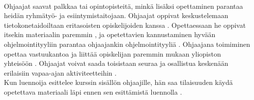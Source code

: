 \documentclass[finnish]{tktltiki2}
\theoremstyle{definition}
\theoremstyle{remark}
\begin{document}
\\
Ohjaajat saavat palkkaa tai opintopisteitä, minkä lisäksi opettaminen parantaa heidän ryhmätyö- ja esiintymistaitojaan. Ohjaajat oppivat keskustelemaan tietokonetaidoiltaan eritasoisten opiskelijoiden kanssa \cite{Vikberg}. Opettaessaan he oppivat itsekin materiaalin paremmin \cite{Reges03}, ja opetettavien kannustaminen hyvään ohjelmointityyliin parantaa ohjaajankin ohjelmointityyliä \cite{Roberts95}. Ohjaajana toimiminen opettaa vastuukantoa ja liittää opiskelijan paremmin mukaan yliopiston yhteisöön \cite{Dickson11}. Ohjaajat voivat saada toisistaan seuraa ja osallistua keskenään erilaisiin vapaa-ajan aktiviteetteihin \cite{Roberts95}.
\\
Kun luennoija esittelee kurssin sisällön ohjaajille, hän saa tilaisuuden käydä opetettava materiaali läpi ennen sen esittämistä luennolla \cite{Kopp00}.
\end{document}
